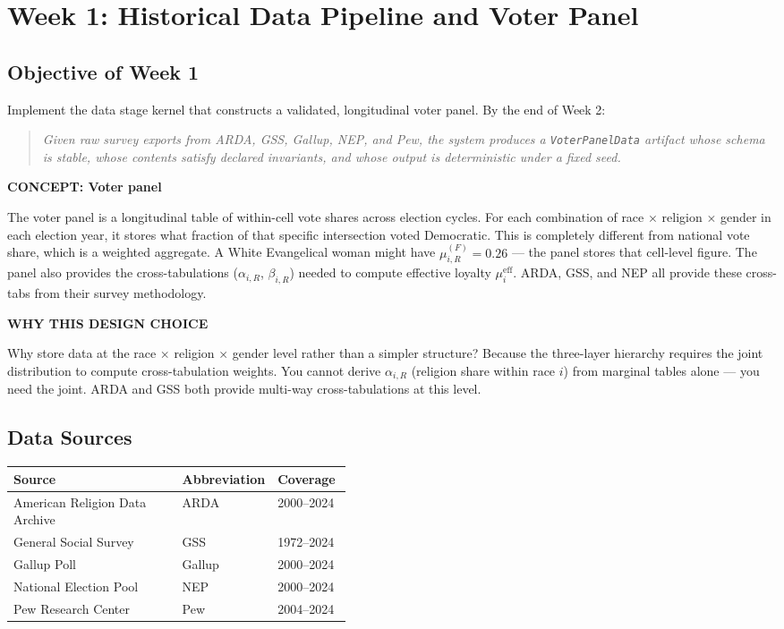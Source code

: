 \documentclass[11pt]{article}
\newcommand{\concept}[2]{%
  \begin{mdframed}[style=conceptbox]
  {\small\bfseries\color{bluefg}CONCEPT: #1}\par\smallskip #2
  \end{mdframed}}
\newcommand{\whybox}[1]{%
  \begin{mdframed}[style=whybox]
  {\small\bfseries\color{greenfg}WHY THIS DESIGN CHOICE}\par\smallskip #1
  \end{mdframed}}
\begin{document}
\section{Week 1: Historical Data Pipeline and Voter Panel}

\subsection*{Objective of Week 1}

Implement the data stage kernel that constructs a validated, longitudinal voter panel. By the
end of Week 2:

\begin{quote}
\textit{Given raw survey exports from ARDA, GSS, Gallup, NEP, and Pew, the system produces a
\texttt{VoterPanelData} artifact whose schema is stable, whose contents satisfy declared
invariants, and whose output is deterministic under a fixed seed.}
\end{quote}

\concept{Voter panel}{
The voter panel is a longitudinal table of within-cell vote shares across election
cycles. For each combination of race $\times$ religion $\times$ gender in each
election year, it stores what fraction of that specific intersection voted Democratic.
This is completely different from national vote share, which is a weighted aggregate.
A White Evangelical woman might have $\mu_{i,R}^{(F)} = 0.26$ --- the panel stores
that cell-level figure. The panel also provides the cross-tabulations
($\alpha_{i,R}$, $\beta_{i,R}$) needed to compute effective loyalty $\mu_i^{\text{eff}}$.
ARDA, GSS, and NEP all provide these cross-tabs from their survey methodology.
}

\whybox{
Why store data at the race $\times$ religion $\times$ gender level rather than a
simpler structure? Because the three-layer hierarchy requires the joint distribution
to compute cross-tabulation weights. You cannot derive $\alpha_{i,R}$ (religion share
within race $i$) from marginal tables alone --- you need the joint. ARDA and GSS
both provide multi-way cross-tabulations at this level.
}

\subsection*{Data Sources}

\begin{center}
\begin{tabularx}{\linewidth}{Xp{0.22\linewidth}p{0.22\linewidth}}
\toprule
\textbf{Source} & \textbf{Abbreviation} & \textbf{Coverage} \\
\midrule
American Religion Data Archive & ARDA & 2000--2024 \\
General Social Survey & GSS & 1972--2024 \\
Gallup Poll & Gallup & 2000--2024 \\
National Election Pool & NEP & 2000--2024 \\
Pew Research Center & Pew & 2004--2024 \\
\bottomrule
\end{tabularx}
\end{center}
\end{document}
